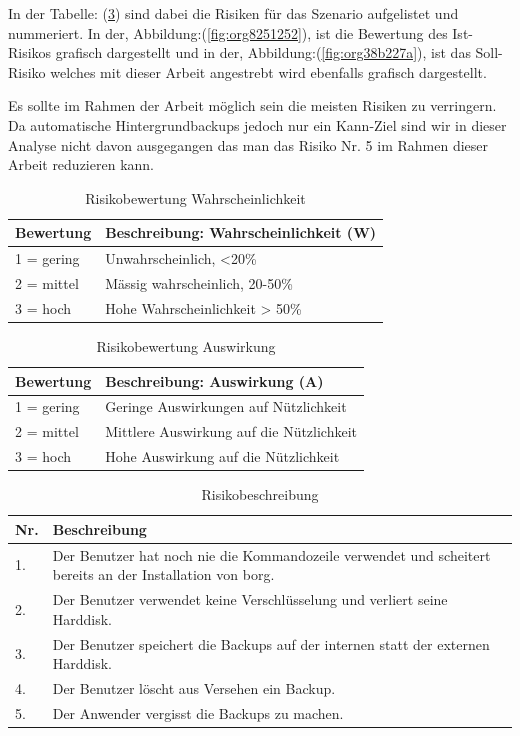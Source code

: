 In der Tabelle: (\ref{tab:orgc2b848f}) sind dabei die Risiken für das
Szenario aufgelistet und nummeriert. In der, Abbildung:(\ref{fig:org8251252}), ist die
Bewertung des Ist-Risikos grafisch dargestellt und in der,
Abbildung:(\ref{fig:org38b227a}), ist das Soll-Risiko welches mit dieser Arbeit
angestrebt wird ebenfalls grafisch dargestellt.

Es sollte im Rahmen der Arbeit möglich sein die meisten Risiken zu verringern.
Da automatische Hintergrundbackups jedoch nur ein Kann-Ziel sind wir in dieser
Analyse nicht davon ausgegangen das man das Risiko Nr. 5 im Rahmen dieser
Arbeit reduzieren kann.

\begin{table}[H]
\centering
\begin{tabular}{l|l}
\textbf{Bewertung} & \textbf{Beschreibung: Wahrscheinlichkeit (W)}\\
\hline
1 = gering & Unwahrscheinlich, <20\%\\
2 = mittel & Mässig wahrscheinlich, 20-50\%\\
3 = hoch & Hohe Wahrscheinlichkeit > 50\%\\
\end{tabular}
\caption{\label{tab:org463c5d5}
Risikobewertung Wahrscheinlichkeit}

\end{table}

\begin{table}[H]
\centering
\begin{tabular}{l|l}
\textbf{Bewertung} & \textbf{Beschreibung: Auswirkung (A)}\\
\hline
1 = gering & Geringe Auswirkungen auf Nützlichkeit\\
2 = mittel & Mittlere Auswirkung auf die Nützlichkeit\\
3 = hoch & Hohe Auswirkung auf die Nützlichkeit\\
\end{tabular}
\caption{\label{tab:org7556e15}
Risikobewertung Auswirkung}

\end{table}

\begin{table}[H]
\centering
\begin{tabular}{|>{\columncolor[HTML]{EFEFEF}}p{}|p{}|}
\hline
\textbf{Nr.}\cellcolor[HTML]{C0C0C0} & \textbf{Beschreibung}\cellcolor[HTML]{C0C0C0}\\
\hline
1. & Der Benutzer hat noch nie die Kommandozeile verwendet und scheitert bereits an der Installation von \gls{borg}.\\
\hline
2. & Der Benutzer verwendet keine Verschlüsselung und verliert seine Harddisk.\\
\hline
3. & Der Benutzer speichert die Backups auf der internen statt der externen Harddisk.\\
\hline
4. & Der Benutzer löscht aus Versehen ein Backup.\\
\hline
5. & Der Anwender vergisst die Backups zu machen.\\
\hline
\end{tabular}
\caption{\label{tab:orgc2b848f}
Risikobeschreibung}

\end{table}


